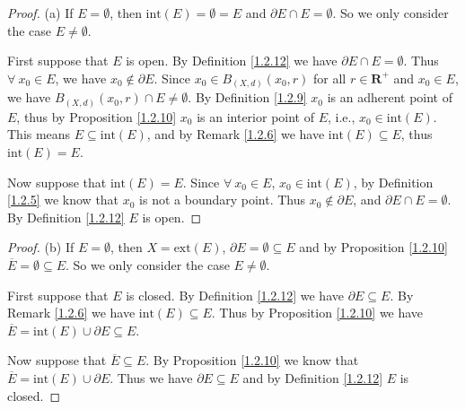 \begin{proof}{(a)}
    If \(E = \emptyset\), then \(\text{int}(E) = \emptyset = E\) and \(\partial E \cap E = \emptyset\).
    So we only consider the case \(E \neq \emptyset\).

    First suppose that \(E\) is open.
    By Definition \ref{1.2.12} we have \(\partial E \cap E = \emptyset\).
    Thus \(\forall\ x_0 \in E\), we have \(x_0 \notin \partial E\).
    Since \(x_0 \in B_{(X, d)}(x_0, r)\) for all \(r \in \mathbf{R}^+\) and \(x_0 \in E\), we have \(B_{(X, d)}(x_0, r) \cap E \neq \emptyset\).
    By Definition \ref{1.2.9} \(x_0\) is an adherent point of \(E\), thus by Proposition \ref{1.2.10} \(x_0\) is an interior point of \(E\), i.e., \(x_0 \in \text{int}(E)\).
    This means \(E \subseteq \text{int}(E)\), and by Remark \ref{1.2.6} we have \(\text{int}(E) \subseteq E\), thus \(\text{int}(E) = E\).

    Now suppose that \(\text{int}(E) = E\).
    Since \(\forall\ x_0 \in E\), \(x_0 \in \text{int}(E)\), by Definition \ref{1.2.5} we know that \(x_0\) is not a boundary point.
    Thus \(x_0 \notin \partial E\), and \(\partial E \cap E = \emptyset\).
    By Definition \ref{1.2.12} \(E\) is open.
\end{proof}

\begin{proof}{(b)}
    If \(E = \emptyset\), then \(X = \text{ext}(E)\), \(\partial E = \emptyset \subseteq E\) and by Proposition \ref{1.2.10} \(\overline{E} = \emptyset \subseteq E\).
    So we only consider the case \(E \neq \emptyset\).

    First suppose that \(E\) is closed.
    By Definition \ref{1.2.12} we have \(\partial E \subseteq E\).
    By Remark \ref{1.2.6} we have \(\text{int}(E) \subseteq E\).
    Thus by Proposition \ref{1.2.10} we have \(\overline{E} = \text{int}(E) \cup \partial E \subseteq E\).

    Now suppose that \(\overline{E} \subseteq E\).
    By Proposition \ref{1.2.10} we know that \(\overline{E} = \text{int}(E) \cup \partial E\).
    Thus we have \(\partial E \subseteq E\) and by Definition \ref{1.2.12} \(E\) is closed.
\end{proof}

